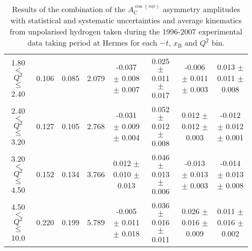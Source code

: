 \begin{table}[width=15cm]
\begin{center}
{\begin{tabular}{|c|c|c|c|c|c|c|c|}
1.80 $<$ $Q^{2}$ $\leqslant$ 2.40 &  0.106 & 0.085 &  2.079 &  -0.037  $\pm$  0.008  $\pm$   0.007 &
 0.025  $\pm$  0.011  $\pm$   0.017 & -0.006 $\pm$   0.011  $\pm$  0.003 & 0.013  $\pm$   0.011  $\pm$  0.008\\
2.40 $<$ $Q^{2}$ $\leqslant$ 3.20 &  0.127 &  0.105 & 2.768 &  -0.031 $\pm$   0.009  $\pm$   0.004 &  
0.052  $\pm$  0.012  $\pm$   0.008 & 0.012  $\pm$  0.012  $\pm$  0.003 & -0.012  $\pm$  0.012  $\pm$  0.001\\
3.20 $<$ $Q^{2}$ $\leqslant$ 4.50 &   0.152 & 0.134 &  3.766 &  0.012  $\pm$  0.010   $\pm$  0.013 & 
0.046 $\pm$   0.013  $\pm$   0.006 & -0.013  $\pm$  0.013 $\pm$ 0.003 & -0.014   $\pm$  0.013  $\pm$  0.008\\
4.50 $<$ $Q^{2}$ $\leqslant$ 10.0 & 0.220  & 0.199 & 5.789  &  -0.005  $\pm$  0.011  $\pm$   0.018 & 
0.036  $\pm$  0.016  $\pm$  0.011 & 0.026 $\pm$   0.016  $\pm$  0.009 & 0.011   $\pm$  0.016   $\pm$   0.002\\
\hline
  \end{tabular}
}
 \end{center}
\caption{Results of the combination of the $A_{\textrm{C}}^{\cos(n\phi)}$ asymmetry amplitudes with statistical and systematic uncertainties and average kinematics from unpolarised hydrogen taken during
the 1996-2007 experimental data taking period at H{\sc ermes} for each $-t$, $x_{\textrm{B}}$ and $Q^{2}$ bin.}
\end{table}

